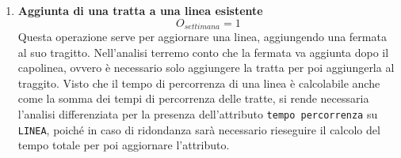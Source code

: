 \documentclass[12pt,a4paper]{report}
\begin{document}
\begin{enumerate}[label=\textbf{\arabic*}]

    \item\textbf{Aggiunta di una tratta a una linea esistente} \label{op20} \\
    \[ {O_{settimana} = 1} \]
    Questa operazione serve per aggiornare una linea, aggiungendo una fermata al suo tragitto. Nell'analisi terremo conto che la fermata va aggiunta dopo il capolinea, ovvero è necessario solo aggiungere la tratta per poi aggiungerla al traggito. Visto che il tempo di percorrenza di una linea è calcolabile anche come la somma dei tempi di percorrenza delle tratte, si rende necessaria l'analisi differenziata per la presenza dell'attributo \texttt{tempo percorrenza} su \texttt{LINEA}, poiché in caso di ridondanza sarà necessario rieseguire il calcolo del tempo totale per poi aggiornare l'attributo.


\end{enumerate}
\end{document}
